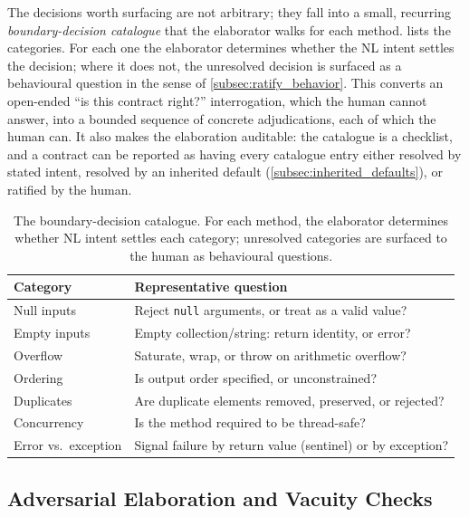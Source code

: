 The decisions worth surfacing are not arbitrary; they fall into a small, recurring \emph{boundary-decision catalogue} that the elaborator walks for each method.  lists the categories. For each one the elaborator determines whether the NL intent settles the decision; where it does not, the unresolved decision is surfaced as a behavioural question in the sense of \cref{subsec:ratify_behavior}. This converts an open-ended ``is this contract right?'' interrogation, which the human cannot answer, into a bounded sequence of concrete adjudications, each of which the human can. It also makes the elaboration auditable: the catalogue is a checklist, and a contract can be reported as having every catalogue entry either resolved by stated intent, resolved by an inherited default (\cref{subsec:inherited_defaults}), or ratified by the human.

\begin{table}[t]
\centering
\caption{The boundary-decision catalogue. For each method, the elaborator determines whether NL intent settles each category; unresolved categories are surfaced to the human as behavioural questions.}
\label{tab:boundary_catalogue}
\begin{tabular}{@{}ll@{}}
\toprule
Category & Representative question \\
\midrule
Null inputs        & Reject \texttt{null} arguments, or treat as a valid value? \\
Empty inputs       & Empty collection/string: return identity, or error? \\
Overflow           & Saturate, wrap, or throw on arithmetic overflow? \\
Ordering           & Is output order specified, or unconstrained? \\
Duplicates         & Are duplicate elements removed, preserved, or rejected? \\
Concurrency        & Is the method required to be thread-safe? \\
Error vs.\ exception & Signal failure by return value (sentinel) or by exception? \\
\bottomrule
\end{tabular}
\end{table}

\subsection{Adversarial Elaboration and Vacuity Checks}
\label{subsec:adversarial}

